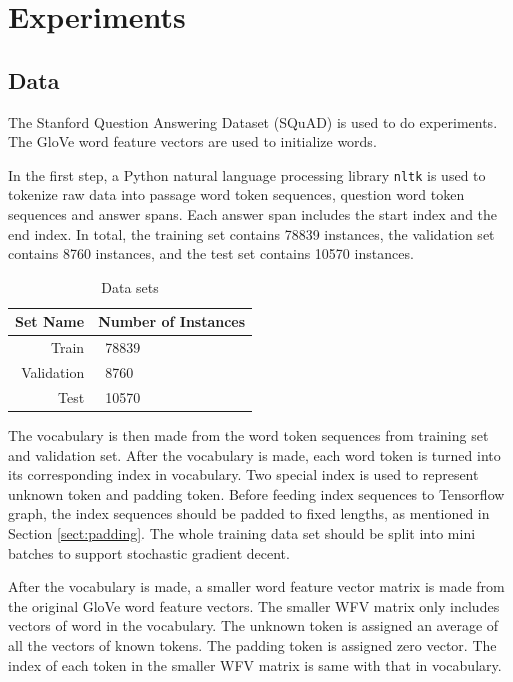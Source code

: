 \documentclass[modernstyle,12pt]{sjsuthesis}
\theoremstyle{definition}
\begin{document}
\chapter{Experiments}
\section{Data}
The Stanford Question Answering Dataset (SQuAD) is used to do experiments. The GloVe word feature vectors\cite{pennington2014glove} are used to initialize words.

In the first step, a Python natural language processing library {\tt nltk} is used to tokenize raw data into passage word token sequences, question word token sequences and answer spans. Each answer span includes the start index and the end index. In total, the training set contains 78839 instances, the validation set contains 8760 instances, and the test set contains 10570 instances.

\begin{table}[htbp]\centering
  \caption{Data sets}
  \label{tab:dataset}
  \begin{tabular}{|r|l|} \hline
    Set Name & Number of Instances \\ \hline\hline
    Train & \ 78839 \\
    Validation & \ 8760 \\
    Test & \ 10570 \\ \hline
  \end{tabular}
\end{table}

The vocabulary is then made from the word token sequences from training set and validation set. After the vocabulary is made, each word token is turned into its corresponding index in vocabulary. Two special index is used to represent unknown token and padding token. Before feeding index sequences to Tensorflow graph, the index sequences should be padded to fixed lengths, as mentioned in Section \ref{sect:padding}. The whole training data set should be split into mini batches to support stochastic gradient decent.

After the vocabulary is made, a smaller word feature vector matrix is made from the original GloVe word feature vectors. The smaller WFV matrix only includes vectors of word in the vocabulary. The unknown token is assigned an average of all the vectors of known tokens. The padding token is assigned zero vector. The index of each token in the smaller WFV matrix is same with that in vocabulary.
\end{document}

